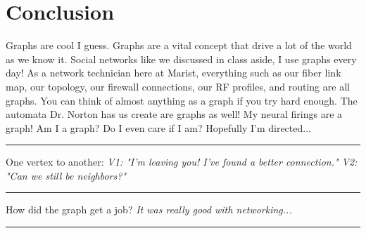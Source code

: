\documentclass[letterpaper, 10pt]{article}
\begin{document}
\section{Conclusion}
Graphs are cool I guess. Graphs are a vital concept that drive a lot of the world as we know it. Social networks like we discussed in class aside, I use graphs every day! As a network technician here at Marist, everything such as our fiber link map, our topology, our firewall connections, our RF profiles, and routing are all graphs. You can think of almost anything as a graph if you try hard enough. The automata Dr. Norton has us create are graphs as well! My neural firings are a graph! Am I a graph? Do I even care if I am? Hopefully I'm directed... \\

\hrule
\vspace{.25cm}
One vertex to another: \textit{V1: "I'm leaving you! I've found a better connection." V2: "Can we still be neighbors?"}
\vspace{.25cm}
\hrule
\vspace{.25cm}
How did the graph get a job? \textit{It was really good with networking...}
\vspace{.25cm}
\hrule
\end{document}
